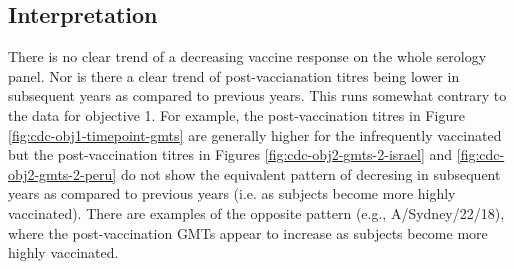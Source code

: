 \documentclass[12pt]{article}
\begin{document}
\subsection{Interpretation}

There is no clear trend of a decreasing vaccine response on the whole serology
panel. Nor is there a clear trend of post-vaccianation titres being lower in subsequent years as compared to previous years. This runs somewhat contrary to
the data for objective 1. For example, the post-vaccination titres in Figure \ref{fig:cdc-obj1-timepoint-gmts} are generally higher for the infrequently vaccinated but the post-vaccination titres in Figures \ref{fig:cdc-obj2-gmts-2-israel} and \ref{fig:cdc-obj2-gmts-2-peru} do not show the equivalent pattern of decresing in subsequent years as compared to previous years (i.e. as subjects become more highly vaccinated). There are examples of the opposite pattern (e.g., A/Sydney/22/18), where the post-vaccination GMTs appear to increase as subjects become more highly vaccinated.
\end{document}
